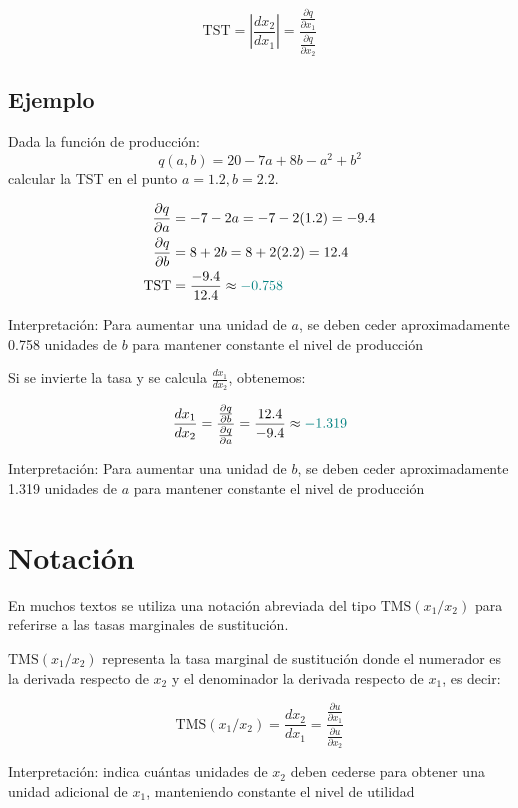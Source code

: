 \documentclass{article}
\begin{document}
\[
\text{TST} = \left| \frac{dx_2}{dx_1} \right| = \frac{\frac{\partial q}{\partial x_1}}{\frac{\partial q}{\partial x_2}}
\]

\subsection*{Ejemplo}

Dada la función de producción:
\[
q(a, b) = 20 - 7a + 8b - a^2 + b^2
\]
calcular la TST en el punto \( a = 1.2, b = 2.2 \).

\begin{align*}
\frac{\partial q}{\partial a} &= -7 - 2a = -7 - 2(1.2) = -9.4 \\
\frac{\partial q}{\partial b} &= 8 + 2b = 8 + 2(2.2) = 12.4 \\
\text{TST} &= \frac{-9.4}{12.4} \approx {\color{teal}-0.758}
\end{align*}

{\color{teal}Interpretación: Para aumentar una unidad de \( a \), se deben ceder aproximadamente 0.758 unidades de \( b \) para mantener constante el nivel de producción}

Si se invierte la tasa y se calcula \( \frac{dx_1}{dx_2} \), obtenemos:

\[
\frac{dx_1}{dx_2} = \frac{\frac{\partial q}{\partial b}}{\frac{\partial q}{\partial a}} = \frac{12.4}{-9.4} \approx {\color{teal}-1.319}
\]

{\color{teal}Interpretación: Para aumentar una unidad de \( b \), se deben ceder aproximadamente 1.319 unidades de \( a \) para mantener constante el nivel de producción}

\section*{Notación}

En muchos textos se utiliza una notación abreviada del tipo \( \text{TMS}(x_1/x_2) \) para referirse a las tasas marginales de sustitución. 

\medskip

{\color{teal}\( \text{TMS}(x_1/x_2) \)} representa la tasa marginal de sustitución donde el numerador es la derivada respecto de \( x_2 \) y el denominador la derivada respecto de \( x_1 \), es decir:

\[
\text{TMS}(x_1/x_2) = \frac{dx_2}{dx_1} = \frac{\frac{\partial u}{\partial x_1}}{\frac{\partial u}{\partial x_2}}
\]

{\color{teal}Interpretación: indica cuántas unidades de \( x_2 \) deben cederse para obtener una unidad adicional de \( x_1 \), manteniendo constante el nivel de utilidad}
\end{document}
